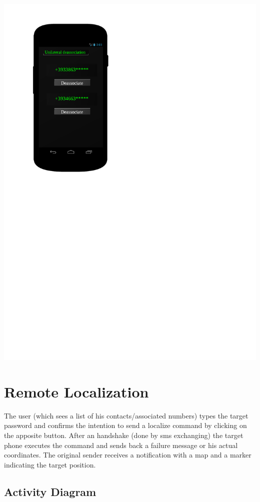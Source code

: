 \includegraphics[scale=0.7]{images/DeassociationAndroid}

\section{Remote Localization}

The user (which sees a list of his contacts/associated numbers) types the
target password and confirms the intention to send a localize command by
clicking on the apposite button. After an handshake (done by sms exchanging)
the target phone executes the command and sends back a failure message or
his actual coordinates. The original sender receives a notification with a map
and a marker indicating the target position.


\newpage
\subsection{Activity Diagram}

